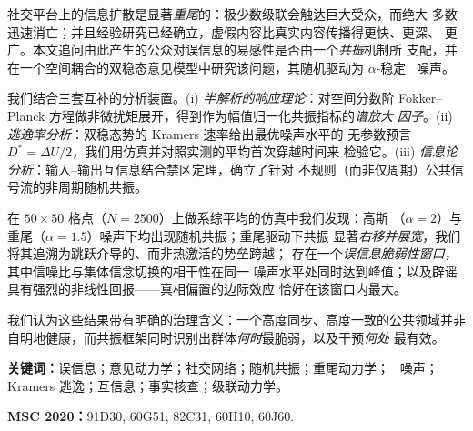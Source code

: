 社交平台上的信息扩散是显著\emph{重尾}的：极少数级联会触达巨大受众，而绝大
多数迅速消亡；并且经验研究已经确立，虚假内容比真实内容传播得更快、更深、
更广。本文追问由此产生的公众对误信息的易感性是否由一个\emph{共振}机制所
支配，并在一个空间耦合的双稳态意见模型中研究该问题，其随机驱动为
$\alpha$-稳定 \Levy\ 噪声。

我们结合三套互补的分析装置。(i) \emph{半解析的响应理论}：对空间分数阶
Fokker--Planck 方程做非微扰矩展开，得到作为幅值归一化共振指标的\emph{谱放大
因子}。(ii) \emph{逃逸率分析}：双稳态势的 Kramers 速率给出最优噪声水平的
无参数预言 $D^{*}=\Delta U/2$，我们用仿真并对照实测的平均首次穿越时间来
检验它。(iii) \emph{信息论分析}：输入--输出互信息结合禁区定理，确立了针对
不规则（而非仅周期）公共信号流的非周期随机共振。

在 $50\times50$ 格点（$N=2500$）上做系综平均的仿真中我们发现：高斯
（$\alpha=2$）与重尾（$\alpha=1.5$）噪声下均出现随机共振；重尾驱动下共振
显著\emph{右移并展宽}，我们将其追溯为跳跃介导的、而非热激活的势垒跨越；
存在一个\emph{误信息脆弱性窗口}，其中信噪比与集体信念切换的相干性在同一
噪声水平处同时达到峰值；以及辟谣具有强烈的非线性回报——真相偏置的边际效应
恰好在该窗口内最大。

我们认为这些结果带有明确的治理含义：一个高度同步、高度一致的公共领域并非
自明地健康，而共振框架同时识别出群体\emph{何时}最脆弱，以及干预\emph{何处}
最有效。

\medskip
\noindent\textbf{关键词：}误信息；意见动力学；社交网络；随机共振；重尾动力学；
\Levy\ 噪声；Kramers 逃逸；互信息；事实核查；级联动力学。

\medskip
\noindent\textbf{MSC 2020：}91D30, 60G51, 82C31, 60H10, 60J60.
